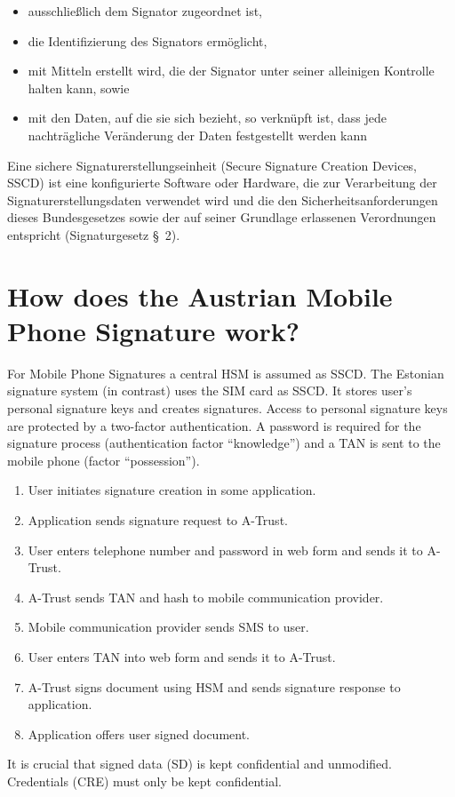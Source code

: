 \documentclass[twocolumn]{article}
\newcommand{\question}[1]{\section{#1}}
\begin{document}
\begin{itemize}
  \item ausschließlich dem Signator zugeordnet ist,
  \item die Identifizierung des Signators ermöglicht,
  \item mit Mitteln erstellt wird, die der Signator unter seiner alleinigen Kontrolle halten kann, sowie
  \item mit den Daten, auf die sie sich bezieht, so verknüpft ist, dass jede nachträgliche Veränderung der Daten festgestellt werden kann
\end{itemize}

Eine sichere Signaturerstellungseinheit (Secure Signature Creation Devices, SSCD) ist eine konfigurierte Software oder Hardware, die zur Verarbeitung der Signaturerstellungsdaten verwendet wird und die den Sicherheitsanforderungen dieses Bundesgesetzes sowie der auf seiner Grundlage erlassenen Verordnungen entspricht (Signaturgesetz §~2).

\question{How does the Austrian Mobile Phone Signature work?}
%
For Mobile Phone Signatures a central HSM is assumed as SSCD. The Estonian signature system (in contrast) uses the SIM card as SSCD. It stores user's personal signature keys and creates signatures. Access to personal signature keys are protected by a two-factor authentication. A password is required for the signature process (authentication factor ``knowledge'') and a TAN is sent to the mobile phone (factor ``possession'').

\begin{enumerate}
  \item User initiates signature creation in some application.
  \item Application sends signature request to A-Trust.
  \item User enters telephone number and password in web form and sends it to A-Trust.
  \item A-Trust sends TAN and hash to mobile communication provider.
  \item Mobile communication provider sends SMS to user.
  \item User enters TAN into web form and sends it to A-Trust.
  \item A-Trust signs document using HSM and sends signature response to application.
  \item Application offers user signed document.
\end{enumerate}

It is crucial that signed data (SD) is kept confidential and unmodified. Credentials (CRE) must only be kept confidential.
\end{document}
